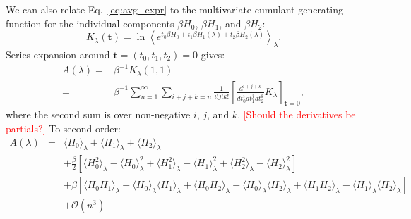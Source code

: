 \documentclass{article}
\newcommand{\warning}[1]{{\textsf{{\textcolor{red}{{[#1]}{}}}}}}
\let\vec\mathbf
\begin{document}
We can also relate Eq.~\ref{eq:avg_expr} to the multivariate cumulant generating function for the individual components $\beta H_0$, $\beta H_1$, and $\beta H_2$:
\begin{equation}
K_\lambda(\vec t) =
	\ln \left\langle 
    	e^{t_0 \beta H_0 + t_1 \beta H_1(\lambda) + t_2 \beta H_2(\lambda)}
    \right\rangle_\lambda.
\end{equation}
Series expansion around $\vec t = (t_0, t_1, t_2) = 0$ gives:
\begin{align}
 A(\lambda) =& \beta^{-1} K_\lambda(1, 1) \nonumber\\
                  =& \beta^{-1} \sum_{n=1}^{\infty}
	        			\sum_{i+j+k=n}
            			\frac{1}{i!j!k!}\left[  \frac{d^{i+j+k}}{ d t_0^i d t_1^j d t_2^k}  K_\lambda\right]_{\vec t=0},
\label{eq:mult_expansion}
\end{align}
where  the second sum is over non-negative $i$, $j$, and $k$. 
\warning{Should the derivatives be partials?}
To second order: 
\begin{eqnarray}
A (\lambda) &=& 
\langle  H_0 \rangle_{\lambda}  + \langle  H_1 \rangle_{\lambda} + \langle  H_2 \rangle_{\lambda}  
\\ \nonumber  & & 
+ \frac{\beta}{2} \left[  \langle  H_0^2 \rangle_{\lambda} -\langle  H_0 \rangle^2_{\lambda}  +
\langle  H_1^2 \rangle_{\lambda} -\langle  H_1 \rangle^2_{\lambda}  
 + \langle  H_2^2 \rangle_{\lambda} -\langle  H_2 \rangle^2_{\lambda}   \right] 
\\ \nonumber  & & 
 + \beta \left[ \langle  H_0 H_1\rangle_{\lambda} -\langle  H_0 \rangle_{\lambda} \langle  H_1 \rangle_{\lambda} 
 +\langle  H_0 H_2\rangle_{\lambda} -\langle  H_0 \rangle_{\lambda} \langle  H_2 \rangle_{\lambda} 
 +\langle  H_1 H_2\rangle_{\lambda} -\langle  H_1 \rangle_{\lambda} \langle  H_2 \rangle_{\lambda} 
   \right]
  \\ & & 
 + \mathcal{O} (n^3) \nonumber
\label{eq:O2_expansion}
\end{eqnarray}
\end{document}
